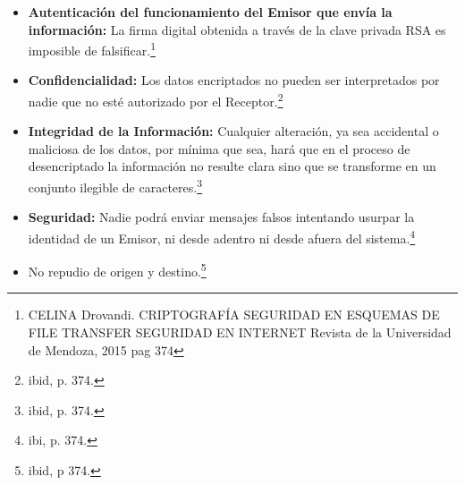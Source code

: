 \documentclass[a4paper,openright,12pt]{book}
\theoremstyle{definition}
\theoremstyle{remark}
\begin{document}
\begin{itemize}
\item \textbf{Autenticación del funcionamiento del Emisor que envía la información:} La firma digital obtenida a través de la clave privada RSA es imposible de falsificar.\footnote{CELINA Drovandi. CRIPTOGRAFÍA
SEGURIDAD EN ESQUEMAS DE FILE TRANSFER SEGURIDAD EN INTERNET Revista de la Universidad de Mendoza, 2015 pag 374}
\item \textbf{Confidencialidad:} Los datos encriptados no pueden ser interpretados por nadie que no esté autorizado por el Receptor.\footnote{ibid, p. 374.}
\item \textbf{Integridad de la Información:} Cualquier alteración, ya sea accidental o maliciosa de los datos, por mínima que sea, hará que en el proceso de desencriptado la información no resulte clara sino que se transforme en un conjunto ilegible de caracteres.\footnote{ibid, p. 374.}
\item \textbf{Seguridad:} Nadie podrá enviar mensajes falsos intentando usurpar la identidad de un Emisor, ni desde adentro ni desde afuera del sistema.\footnote{ibi, p. 374.}
\item No repudio de origen y destino.\footnote{ibid, p 374.}
\end{itemize}
\end{document}

